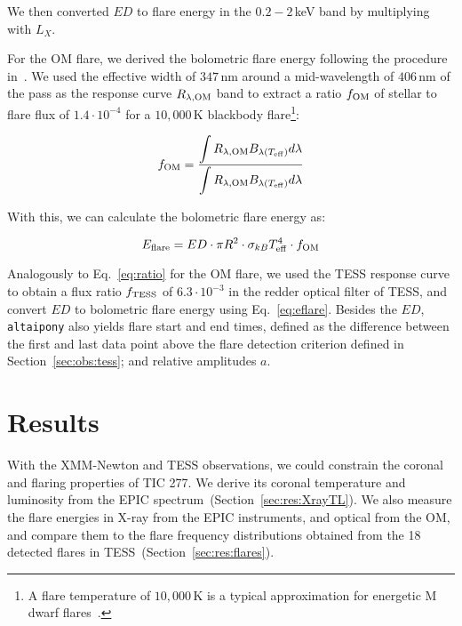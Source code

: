 \documentclass[twocolumn]{aastex631}
\begin{document}
We then converted $ED$ to flare energy in the $0.2-2\,$keV band by multiplying with $L_X$. 

For the OM flare, we derived the bolometric flare energy following the procedure in~\citet{shibayama2013superflares}. We used the effective width of $347\,$nm around a mid-wavelength of $406\,$nm of the pass as the response curve $R_{\lambda, \rm OM}$ band to extract a ratio $f_{\rm OM}$ of stellar to flare flux of $1.4\cdot 10^{-4}$ for a $10,000\,$K blackbody flare\footnote{A flare temperature of $10,000\,$K is a typical approximation for energetic M dwarf flares~\citep{kowalski2013timeresolved, howard2020evryflarea}.}:

\begin{equation}
    f_{\rm OM} = \frac{\displaystyle\int R_{\lambda, \rm OM} B_{\lambda(T_{\rm eff})}  d\lambda}{\displaystyle\int R_{\lambda, \rm OM} B_{\lambda(T_{\rm eff})} d\lambda} 
    \label{eq:ratio}
\end{equation}

With this, we can calculate the bolometric flare energy as:

\begin{equation}
    E_{\rm flare} = ED \cdot \pi R^2 \cdot \sigma_{kB} T_{\rm eff}^4 \cdot f_{\rm OM}
    \label{eq:eflare}
\end{equation}


Analogously to Eq.~\ref{eq:ratio} for the OM flare, we used the TESS response curve to obtain a flux ratio $f_{\rm TESS}$ of $6.3\cdot10^{-3}$ in the redder optical filter of TESS, and convert $ED$ to bolometric flare energy using Eq.~\ref{eq:eflare}. Besides the $ED$, \texttt{altaipony} also yields flare start and end times, defined as the difference between the first and last data point above the flare detection criterion defined in Section~\ref{sec:obs:tess}; and relative amplitudes $a$.

\section{Results}

With the XMM-Newton and TESS observations, we could constrain the coronal and flaring properties of TIC 277. We derive its coronal temperature and luminosity from the EPIC spectrum~(Section~\ref{sec:res:XrayTL}). We also measure the flare energies in X-ray from the EPIC instruments, and optical from the OM, and compare them to the flare frequency distributions obtained from the 18 detected flares in TESS~(Section~\ref{sec:res:flares}).
\end{document}
